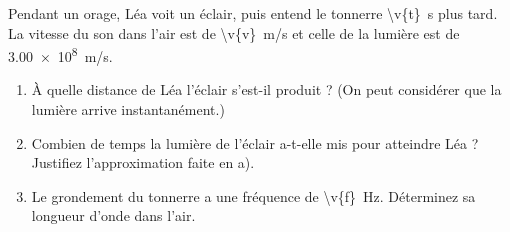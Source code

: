 Pendant un orage, Léa voit un éclair, puis entend le tonnerre \qty{\v{t}}{s} plus tard. La vitesse du son dans l'air est de \qty{\v{v}}{m/s} et celle de la lumière est de \qty{3.00e8}{m/s}.

\begin{enumerate}[label=\alph*)]
    \item À quelle distance de Léa l'éclair s'est-il produit ? (On peut considérer que la lumière arrive instantanément.)
    \item Combien de temps la lumière de l'éclair a-t-elle mis pour atteindre Léa ? Justifiez l'approximation faite en a).
    \item Le grondement du tonnerre a une fréquence de \qty{\v{f}}{Hz}. Déterminez sa longueur d'onde dans l'air.
\end{enumerate}
